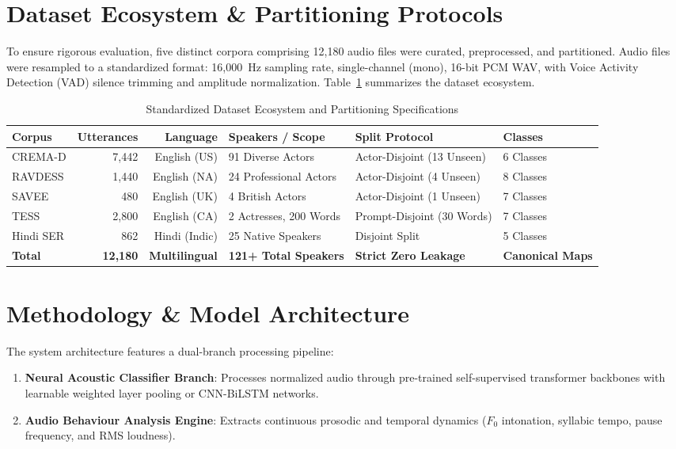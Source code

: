 \documentclass[10pt,journal,compsoc]{IEEEtran}
\begin{document}
\section{Dataset Ecosystem \& Partitioning Protocols}
\label{sec:data}

To ensure rigorous evaluation, five distinct corpora comprising 12,180 audio files were curated, preprocessed, and partitioned. Audio files were resampled to a standardized format: 16,000~Hz sampling rate, single-channel (mono), 16-bit PCM WAV, with Voice Activity Detection (VAD) silence trimming and amplitude normalization. Table~\ref{tab:datasets} summarizes the dataset ecosystem.

\begin{table}[t]
\caption{Standardized Dataset Ecosystem and Partitioning Specifications}
\label{tab:datasets}
\centering
\begin{tabular}{lrrlll}
\toprule
\textbf{Corpus} & \textbf{Utterances} & \textbf{Language} & \textbf{Speakers / Scope} & \textbf{Split Protocol} & \textbf{Classes} \\
\midrule
CREMA-D & 7,442 & English (US) & 91 Diverse Actors & Actor-Disjoint (13 Unseen) & 6 Classes \\
RAVDESS & 1,440 & English (NA) & 24 Professional Actors & Actor-Disjoint (4 Unseen) & 8 Classes \\
SAVEE & 480 & English (UK) & 4 British Actors & Actor-Disjoint (1 Unseen) & 7 Classes \\
TESS & 2,800 & English (CA) & 2 Actresses, 200 Words & Prompt-Disjoint (30 Words) & 7 Classes \\
Hindi SER & 862 & Hindi (Indic) & 25 Native Speakers & Disjoint Split & 5 Classes \\
\midrule
\textbf{Total} & \textbf{12,180} & \textbf{Multilingual} & \textbf{121+ Total Speakers} & \textbf{Strict Zero Leakage} & \textbf{Canonical Maps} \\
\bottomrule
\end{tabular}
\end{table}

\section{Methodology \& Model Architecture}
\label{sec:methods}

The system architecture features a dual-branch processing pipeline:
\begin{enumerate}
    \item \textbf{Neural Acoustic Classifier Branch}: Processes normalized audio through pre-trained self-supervised transformer backbones with learnable weighted layer pooling or CNN-BiLSTM networks.
    \item \textbf{Audio Behaviour Analysis Engine}: Extracts continuous prosodic and temporal dynamics ($F_0$ intonation, syllabic tempo, pause frequency, and RMS loudness).
\end{enumerate}
\end{document}
